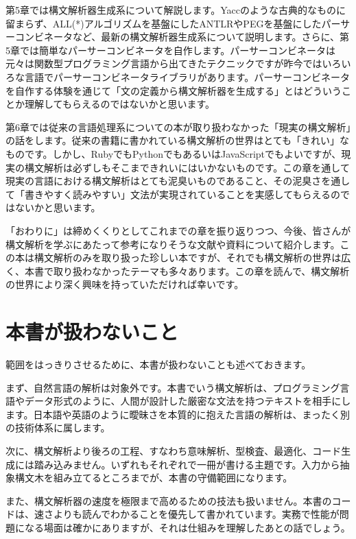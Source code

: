 第5章では構文解析器生成系について解説します。Yaccのような古典的なものに留まらず、ALL(*)アルゴリズムを基盤にしたANTLRやPEGを基盤にしたパーサーコンビネータなど、最新の構文解析器生成系について説明します。さらに、第5章では簡単なパーサーコンビネータを自作します。パーサーコンビネータは元々は関数型プログラミング言語から出てきたテクニックですが昨今ではいろいろな言語でパーサーコンビネータライブラリがあります。パーサーコンビネータを自作する体験を通じて「文の定義から構文解析器を生成する」とはどういうことか理解してもらえるのではないかと思います。

第6章では従来の言語処理系についての本が取り扱わなかった「現実の構文解析」の話をします。従来の書籍に書かれている構文解析の世界はとても「きれい」なものです。しかし、RubyでもPythonでもあるいはJavaScriptでもよいですが、現実の構文解析は必ずしもそこまできれいにはいかないものです。この章を通して現実の言語における構文解析はとても泥臭いものであること、その泥臭さを通して「書きやすく読みやすい」文法が実現されていることを実感してもらえるのではないかと思います。

「おわりに」は締めくくりとしてこれまでの章を振り返りつつ、今後、皆さんが構文解析を学ぶにあたって参考になりそうな文献や資料について紹介します。この本は構文解析のみを取り扱った珍しい本ですが、それでも構文解析の世界は広く、本書で取り扱わなかったテーマも多々あります。この章を読んで、構文解析の世界により深く興味を持っていただければ幸いです。

\section*{本書が扱わないこと}

範囲をはっきりさせるために、本書が扱わないことも述べておきます。

まず、自然言語の解析は対象外です。本書でいう構文解析は、プログラミング言語やデータ形式のように、人間が設計した厳密な文法を持つテキストを相手にします。日本語や英語のように曖昧さを本質的に抱えた言語の解析は、まったく別の技術体系に属します。

次に、構文解析より後ろの工程、すなわち意味解析、型検査、最適化、コード生成には踏み込みません。いずれもそれぞれで一冊が書ける主題です。入力から抽象構文木を組み立てるところまでが、本書の守備範囲になります。

また、構文解析器の速度を極限まで高めるための技法も扱いません。本書のコードは、速さよりも読んでわかることを優先して書かれています。実務で性能が問題になる場面は確かにありますが、それは仕組みを理解したあとの話でしょう。

